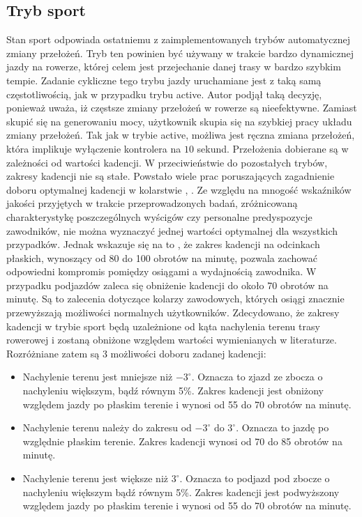 \subsection{Tryb sport}  
Stan sport odpowiada ostatniemu z zaimplementowanych trybów automatycznej zmiany przełożeń. Tryb ten powinien być używany w trakcie bardzo dynamicznej jazdy na rowerze, której celem jest przejechanie danej trasy w bardzo szybkim tempie. Zadanie cykliczne tego trybu jazdy uruchamiane jest z taką samą częstotliwością, jak w przypadku trybu active. Autor podjął taką decyzję, ponieważ uważa, iż częstsze zmiany przełożeń w rowerze są nieefektywne. Zamiast skupić się na generowaniu mocy, użytkownik skupia się na szybkiej pracy układu zmiany przełożeń. Tak jak w trybie active, możliwa jest ręczna zmiana przełożeń, która implikuje wyłączenie kontrolera na $10$ sekund. Przełożenia dobierane są w zależności od wartości kadencji. W przeciwieństwie do pozostałych trybów, zakresy kadencji nie są stałe. Powstało wiele prac poruszających zagadnienie doboru optymalnej kadencji w kolarstwie \cite{cuttingEdge}, \cite{optCadence}. Ze względu na mnogość wskaźników jakości przyjętych w trakcie przeprowadzonych badań, zróżnicowaną charakterystykę poszczególnych wyścigów czy personalne predyspozycje zawodników, nie można wyznaczyć jednej wartości optymalnej dla wszystkich przypadków. Jednak wskazuje się na to \cite{cuttingEdge}, że zakres kadencji na odcinkach płaskich, wynoszący od 80 do 100 obrotów na minutę, pozwala zachować odpowiedni kompromis pomiędzy osiągami a wydajnością zawodnika. W przypadku podjazdów zaleca się obniżenie kadencji do około 70 obrotów na minutę. Są to zalecenia dotyczące kolarzy zawodowych, których osiągi znacznie przewyższają możliwości normalnych użytkowników. Zdecydowano, że zakresy kadencji w trybie sport będą uzależnione od kąta nachylenia terenu trasy rowerowej i zostaną obniżone względem wartości wymienianych w literaturze. Rozróżniane zatem są 3 możliwości doboru zadanej kadencji:
\begin{itemize}
\item
Nachylenie terenu jest mniejsze niż $-3^{\circ}$. Oznacza to zjazd ze zbocza o nachyleniu większym, bądź równym 5\%. Zakres kadencji jest obniżony względem jazdy po płaskim terenie i wynosi od 55 do 70 obrotów na minutę.
\item
    Nachylenie terenu należy do zakresu od $-3^{\circ}$ do $3^{\circ}$. Oznacza to jazdę po względnie płaskim terenie. Zakres kadencji wynosi od 70 do 85 obrotów na minutę.
\item
Nachylenie terenu jest większe niż $3^{\circ}$. Oznacza to podjazd pod zbocze o nachyleniu większym bądź równym 5\%. Zakres kadencji jest podwyższony względem jazdy po płaskim terenie i wynosi od 55 do 70 obrotów na minutę.

\end{itemize}
